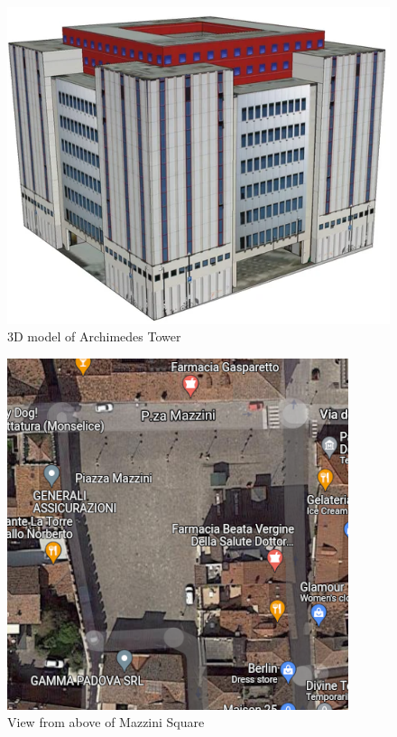 	\begin{minipage}{0.5\textwidth}%
		\begin{figure}[H]
			\centering
			\includegraphics[width=\textwidth]{resources/img/chap5/archimede_1}
			\caption{3D model of Archimedes Tower}
			\label{img:archimede_1}
		\end{figure}
	\end{minipage}%
	\hfill%
	\begin{minipage}{0.5\textwidth}\raggedright
		\begin{figure}[H]
			\centering
			\includegraphics[width=.8\textwidth]{resources/img/chap5/pzza_mazzini_2}
			\caption{View from above of Mazzini Square}
			\label{img:pzza_mazzini_1}
		\end{figure}
	\end{minipage}%
	
